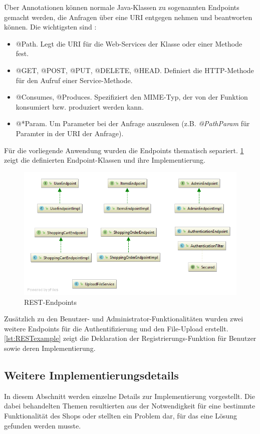 Über Annotationen können normale Java-Klassen zu sogenannten Endpoints gemacht werden, die Anfragen über eine \acs{URI} entgegen nehmen und beantworten können.
Die wichtigsten sind \cite{Jersey2017a}:

\begin{itemize}
\item{@Path.} Legt die \acs{URI} für die Web-Services der Klasse oder einer Methode fest.
\item{@GET, @POST, @PUT, @DELETE, @HEAD.} Definiert die \acs{HTTP}-Methode für den Aufruf einer Service-Methode.
\item{@Consumes, @Produces.} Spezifiziert den \acs{MIME}-Typ, der von der Funktion konsumiert bzw. produziert werden kann.
\item{@*Param.} Um Parameter bei der Anfrage auszulesen (z.B. \textit{@PathParam} für Paramter in der \acs{URI} der Anfrage).
\end{itemize}

Für die vorliegende Anwendung wurden die Endpoints thematisch separiert.
\cref{fig:endpoints} zeigt die definierten Endpoint-Klassen und ihre Implementierung.

\begin{figure}[th!]
	\centering
	\includegraphics[width=0.5\linewidth]{bilder/kap7/api_diagram}
	\caption{REST-Endpoints}
	\label{fig:endpoints}
\end{figure}

Zusätzlich zu den Benutzer- und Administrator-Funktionalitäten wurden zwei weitere Endpoints für die Authentifizierung und den File-Upload erstellt.
\\


\cref{lst:RESTexample} zeigt die Deklaration der Registrierungs-Funktion für Benutzer sowie deren Implementierung.

\subsection{Weitere Implementierungsdetails}
In diesem Abschnitt werden einzelne Details zur Implementierung vorgestellt.
Die dabei behandelten Themen resultierten aus der Notwendigkeit für eine bestimmte Funktionalität des Shops oder stellten ein Problem dar, für das eine Lösung gefunden werden musste.
